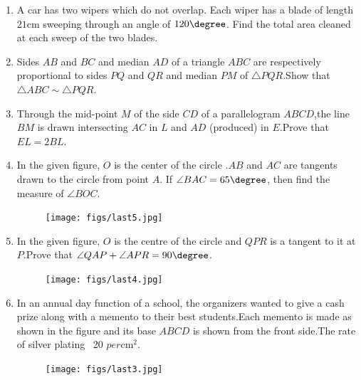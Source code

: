 \begin{enumerate}

\item A car has two wipers which do not overlap. Each wiper has a blade of length $21 \mathrm{cm}$ sweeping through an angle of $120\degree$. Find the total area cleaned at each sweep of the two blades.

\item Sides $AB$ and $BC$ and median $AD$ of a triangle $ABC$ are respectively proportional to sides $PQ$ and $QR$ and median $PM$ of $\triangle PQR$.Show that $\triangle ABC \sim \triangle PQR$.

\item Through the mid-point $M$ of the side $CD$ of a parallelogram $ABCD$,the line $BM$ is drawn intersecting $AC$ in $L$ and $AD$ (produced) in $E$.Prove that $EL = 2BL$. 

\item In the given figure, $O$ is the center of the circle .$AB$ and $AC$ are tangents drawn to the circle from point $A$. If $\angle BAC = 65\degree $, then find the measure of $\angle BOC $.
	\begin{figure}[!ht]
		\centering
		\texttt{[image: figs/last5.jpg]}
		\caption{}
		\label{fig:enter-label}
	\end{figure}

\newpage
\item In the given figure, $O$ is the centre of the circle and $QPR$ is a tangent to it at $P$.Prove that $\angle QAP + \angle APR = 90\degree$.

	\begin{figure}[!ht]
		\centering
		\texttt{[image: figs/last4.jpg]}
		\caption{}
		\label{fig:enter-label}
	\end{figure}
\newpage
\item In an annual day function of a school, the organizers wanted to give a cash prize along with a memento to their best students.Each memento is made as shown in the figure and its base $ABCD$ is shown from the front side.The rate of silver plating \rupee~20 $per  \mathrm{cm}^2$.

	\begin{figure}[!ht]
		\centering
		\texttt{[image: figs/last3.jpg]}
		\caption{}
		\label{fig:enter-label}
	\end{figure}


\end{enumerate}
